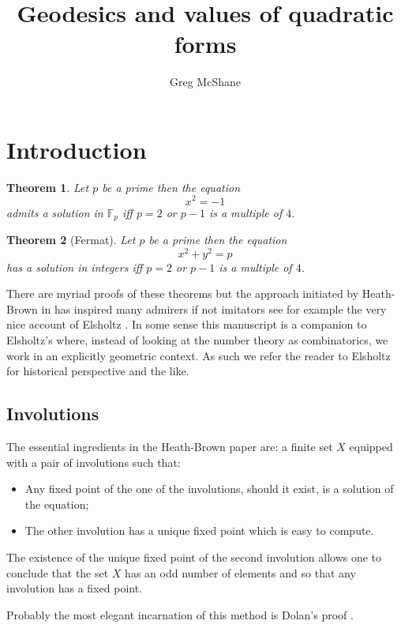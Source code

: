 \documentclass[12pt,a4paper]{amsart}
\title{Geodesics and values of quadratic forms}
\author[McShane]{Greg McShane}
\newtheorem{thm}{Theorem}[section]
\def\fp{\mathbb{F}_p}
\begin{document}
\maketitle

\section{Introduction}

	

\begin{thm}\label{triv}
Let $p$ be a prime then the equation
$$x^2 = -1$$
admits a solution in $\fp$ iff 
$p =2$ or $p-1$ is a multiple of $4$.
\end{thm}


\begin{thm}[Fermat]\label{main}
Let $p$ be a prime then the equation
$$x^2 + y^2 = p $$
has a solution in integers  iff  $p =2$ or $p-1$ is a multiple of $4$.
\end{thm}

There are myriad proofs of these theorems but the approach initiated
by Heath-Brown in \cite{heath} has inspired many admirers if not 
imitators see for example the very nice account of Elsholtz \cite{elsholtz}.
In some sense this manuscript is a companion 
to Elsholtz's where, instead of looking at the number theory as
combinatorics, we work in an explicitly geometric context.
As such we refer the reader to Elsholtz for historical perspective
and the like.

\subsection{Involutions}

The essential ingredients in the Heath-Brown paper are:
a finite set $X$ equipped with a pair of involutions such that:


\begin{itemize}
	\item Any fixed point of the one of the involutions,
		should it exist, is a solution of the equation;
	\item The other involution has a unique fixed point which is easy to compute.
\end{itemize}

The existence of the unique fixed point of the second involution
allows one to conclude that the set $X$ has an odd number of elements
and so that any involution has a fixed point.

Probably the most elegant incarnation of this method is Dolan's
proof \cite{dolan}.
\end{document}
